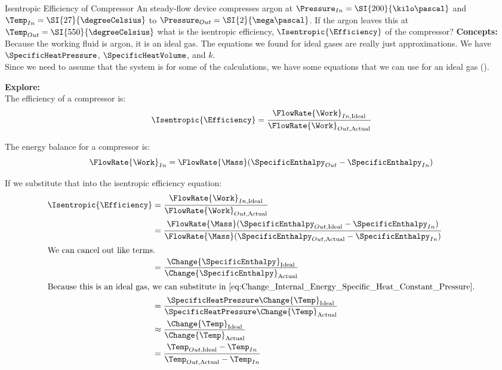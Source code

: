 \begin{example}{Isentropic Efficiency of Compressor}
  An  steady-flow device compresses argon at $\Pressure_{In} = \SI{200}{\kilo\pascal}$ and $\Temp_{In} = \SI{27}{\degreeCelsius}$ to $\Pressure_{Out} = \SI{2}{\mega\pascal}$.
  If the argon leaves this  at $\Temp_{Out} = \SI{550}{\degreeCelsius}$ what is the isentropic efficiency, $\Isentropic{\Efficiency}$ of the compressor?
  \tcblower{}
  \textbf{Concepts:} \\
  Because the working fluid is argon, it is an ideal gas.
  The equations we found for ideal gases are really just approximations.
  We have $\SpecificHeatPressure$, $\SpecificHeatVolume$, and $k$. \\
  Since we need to assume that the system is  for some of the calculations, we have some equations that we can use for an ideal gas ().

  \textbf{Explore:} \\
  The efficiency of a compressor is:
  \begin{equation*}
    \Isentropic{\Efficiency} = \frac{\FlowRate{\Work}_{In, \text{Ideal}}}{\FlowRate{\Work}_{Out, \text{Actual}}}
  \end{equation*}

  The energy balance for a compressor is:
  \begin{equation*}
    \FlowRate{\Work}_{In} = \FlowRate{\Mass} (\SpecificEnthalpy_{Out} - \SpecificEnthalpy_{In})
  \end{equation*}

  If we substitute that into the isentropic efficiency equation:
  \begin{align*}
    \Isentropic{\Efficiency} &= \frac{\FlowRate{\Work}_{In, \text{Ideal}}}{\FlowRate{\Work}_{Out, \text{Actual}}} \\
                             &= \frac{\FlowRate{\Mass} (\SpecificEnthalpy_{Out, \text{Ideal}} - \SpecificEnthalpy_{In})}{\FlowRate{\Mass} (\SpecificEnthalpy_{Out, \text{Actual}} - \SpecificEnthalpy_{In})} \\
    \shortintertext{We can cancel out like terms.}
                             &= \frac{\Change{\SpecificEnthalpy}_{\text{Ideal}}}{\Change{\SpecificEnthalpy}_{\text{Actual}}} \\
    \intertext{Because this is an ideal gas, we can substitute in \Cref{eq:Change_Internal_Energy_Specific_Heat_Constant_Pressure}.}
                             &= \frac{\SpecificHeatPressure \Change{\Temp}_{\text{Ideal}}}{\SpecificHeatPressure \Change{\Temp}_{\text{Actual}}} \\
                             &\approx \frac{\Change{\Temp}_{\text{Ideal}}}{\Change{\Temp}_{\text{Actual}}} \\
    &= \frac{\Temp_{Out, \text{Ideal}} - \Temp_{In}}{\Temp_{Out, \text{Actual}} - \Temp_{In}}
  \end{align*}


\end{example}

